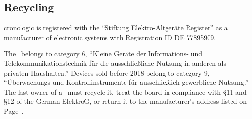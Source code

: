 \subsection{Recycling}
cronologic is registered with the ``Stiftung Elektro-Altger\"a{}te Register''
as a manufacturer of electronic systems with Registration ID DE 77895909.\par
The \deviceName\ belongs to category 6, ``Kleine Geräte der Informations- und
Telekommunikationstechnik für die ausschließliche Nutzung in anderen als
privaten Haushalten.''  Devices sold before 2018 belong to category 9,
``\"U{}berwachungs und Kontrollinstrumente f\"u{}r aus\-schlie\ss lich
gewerbliche Nutzung.'' The last owner of a \deviceName\ must recycle it,
treat the board in compliance with \S{}11 and \S{}12 of the German ElektroG,
or return it to the manufacturer's address listed on Page~\pageref{cp:manu}.